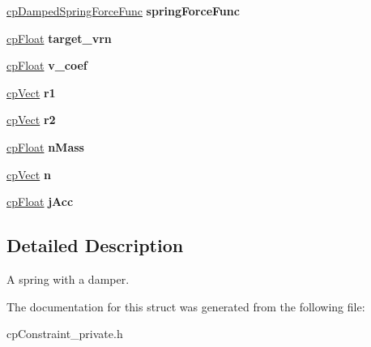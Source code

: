 \begin{DoxyCompactItemize}
\item 
\hypertarget{structcp_damped_spring_aa60f86823b89c951e6dff6defc3b5692}{}\hyperlink{group__cp_damped_spring_gad88d8466e0057d4ad05183fb14fa274d}{cp\+Damped\+Spring\+Force\+Func} {\bfseries spring\+Force\+Func}\label{structcp_damped_spring_aa60f86823b89c951e6dff6defc3b5692}

\item 
\hypertarget{structcp_damped_spring_ae52d9c75dc9d5014c384144de1bb6055}{}\hyperlink{group__basic_types_gac1ed65573e035bf892505768c852d8d3}{cp\+Float} {\bfseries target\+\_\+vrn}\label{structcp_damped_spring_ae52d9c75dc9d5014c384144de1bb6055}

\item 
\hypertarget{structcp_damped_spring_a75975322d892c943d987d214a7d9ea48}{}\hyperlink{group__basic_types_gac1ed65573e035bf892505768c852d8d3}{cp\+Float} {\bfseries v\+\_\+coef}\label{structcp_damped_spring_a75975322d892c943d987d214a7d9ea48}

\item 
\hypertarget{structcp_damped_spring_ab43b3ecbd18b7aadde8714805ab19cff}{}\hyperlink{structcp_vect}{cp\+Vect} {\bfseries r1}\label{structcp_damped_spring_ab43b3ecbd18b7aadde8714805ab19cff}

\item 
\hypertarget{structcp_damped_spring_a0dd22a669019cfa056e74b4f748c41b7}{}\hyperlink{structcp_vect}{cp\+Vect} {\bfseries r2}\label{structcp_damped_spring_a0dd22a669019cfa056e74b4f748c41b7}

\item 
\hypertarget{structcp_damped_spring_a7345162bd8d559fca663af2263ce262f}{}\hyperlink{group__basic_types_gac1ed65573e035bf892505768c852d8d3}{cp\+Float} {\bfseries n\+Mass}\label{structcp_damped_spring_a7345162bd8d559fca663af2263ce262f}

\item 
\hypertarget{structcp_damped_spring_acc3698e3f3252f62917a2554f0edf69f}{}\hyperlink{structcp_vect}{cp\+Vect} {\bfseries n}\label{structcp_damped_spring_acc3698e3f3252f62917a2554f0edf69f}

\item 
\hypertarget{structcp_damped_spring_ab747cd9a7a810442486286138edb7abe}{}\hyperlink{group__basic_types_gac1ed65573e035bf892505768c852d8d3}{cp\+Float} {\bfseries j\+Acc}\label{structcp_damped_spring_ab747cd9a7a810442486286138edb7abe}

\end{DoxyCompactItemize}


\subsection{Detailed Description}
A spring with a damper. 

The documentation for this struct was generated from the following file\+:\begin{DoxyCompactItemize}
\item 
cp\+Constraint\+\_\+private.\+h\end{DoxyCompactItemize}
